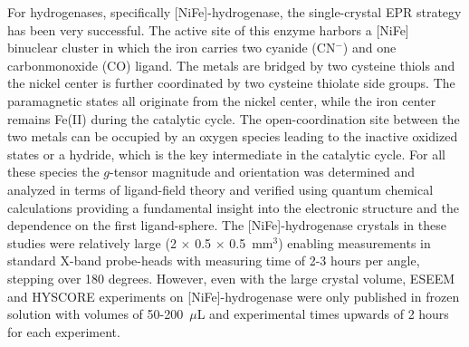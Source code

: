 For hydrogenases, specifically [NiFe]-hydrogenase, the single-crystal EPR strategy has been very successful. \cite{NiFe1996,NiFe2000, NiFe2003, NiFeRev2007} The active site of this enzyme harbors a [NiFe] binuclear cluster in which the iron carries two cyanide (CN$^-$) and one carbonmonoxide (CO) ligand. The metals are bridged by two cysteine thiols and the nickel center is further coordinated by two cysteine thiolate side groups. The paramagnetic states all originate from the nickel center, while the iron center remains Fe(II) during the catalytic cycle. \cite{lubitzhyd} The open-coordination site between the two metals can be occupied by an oxygen species leading to the inactive oxidized states or a hydride, which is the key intermediate in the catalytic cycle. \cite{NiFeRev2007} For all these species the $g$-tensor magnitude and orientation was determined and analyzed in terms of ligand-field theory and verified using quantum chemical calculations providing a fundamental insight into the electronic structure and the dependence on the first ligand-sphere. \cite{Ping2005, Gasteljp0573902, NiFeRev2007, LubitzNiFe2016} The [NiFe]-hydrogenase crystals in these studies were relatively large (2 $\times$ 0.5 $\times$ 0.5~mm$^3$) enabling measurements in standard X-band probe-heads with measuring time of 2-3 hours per angle, stepping over 180 degrees. However, even with the large crystal volume, ESEEM and HYSCORE experiments on [NiFe]-hydrogenase were only published in frozen solution with volumes of 50-200~$\mu$L and experimental times upwards of 2 hours for each experiment. \cite{NiFeRev2007} 

